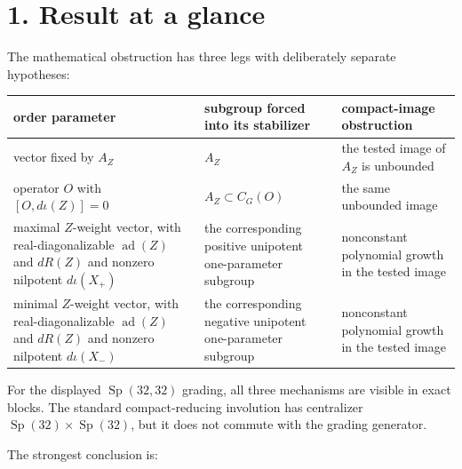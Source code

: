 \documentclass[
  10pt,
  letterpaper,
  oneside]{scrartcl}
\newcounter{none} %
\begin{document}
\section{1. Result at a glance}\label{result-at-a-glance}

The mathematical obstruction has three legs with deliberately separate
hypotheses:

{\def\LTcaptype{none} %
\begin{longtable}[]{@{}
  >{\raggedright\arraybackslash}p{}
  >{\raggedright\arraybackslash}p{}
  >{\raggedright\arraybackslash}p{}@{}}
\toprule\noalign{}
\begin{minipage}[b]{\linewidth}\raggedright
order parameter
\end{minipage} & \begin{minipage}[b]{\linewidth}\raggedright
subgroup forced into its stabilizer
\end{minipage} & \begin{minipage}[b]{\linewidth}\raggedright
compact-image obstruction
\end{minipage} \\
\midrule\noalign{}
\endhead
\bottomrule\noalign{}
\endlastfoot
vector fixed by \(A_Z\) & \(A_Z\) & the tested image of \(A_Z\) is
unbounded \\
operator \(O\) with \([O,d\iota(Z)]=0\) & \(A_Z\subset C_G(O)\) & the
same unbounded image \\
maximal \(Z\)-weight vector, with real-diagonalizable
\(\operatorname{ad}(Z)\) and \(dR(Z)\) and nonzero nilpotent
\(d\iota(X_+)\) & the corresponding positive unipotent one-parameter
subgroup & nonconstant polynomial growth in the tested image \\
minimal \(Z\)-weight vector, with real-diagonalizable
\(\operatorname{ad}(Z)\) and \(dR(Z)\) and nonzero nilpotent
\(d\iota(X_-)\) & the corresponding negative unipotent one-parameter
subgroup & nonconstant polynomial growth in the tested image \\
\end{longtable}
}

For the displayed \(\operatorname{Sp}(32,32)\) grading, all three
mechanisms are visible in exact blocks. The standard compact-reducing
involution has centralizer
\(\operatorname{Sp}(32)\times\operatorname{Sp}(32)\), but it does not
commute with the grading generator.

The strongest conclusion is:
\end{document}
